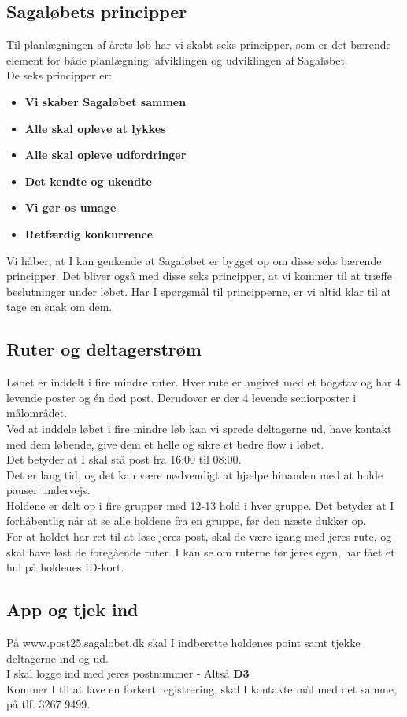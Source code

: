 \subsection{Sagaløbets principper}
Til planlægningen af årets løb har vi skabt seks principper, som er det bærende element for både planlægning, afviklingen og udviklingen af Sagaløbet.\\
De seks principper er:
\begin{itemize}
  \item \textbf{Vi skaber Sagaløbet sammen}
  \item \textbf{Alle skal opleve at lykkes}
  \item \textbf{Alle skal opleve udfordringer}
  \item \textbf{Det kendte og ukendte}
  \item \textbf{Vi gør os umage}
  \item \textbf{Retfærdig konkurrence}
\end{itemize}
Vi håber, at I kan genkende at Sagaløbet er bygget op om disse seks bærende principper. Det bliver også med disse seks principper, at vi kommer til at træffe beslutninger under løbet. Har I spørgsmål til principperne, er vi altid klar til at tage en snak om dem.
\subsection{Ruter og deltagerstrøm}
Løbet er inddelt i fire mindre ruter. Hver rute er angivet med et bogstav og har 4 levende poster og én død post. Derudover er der 4 levende seniorposter i målområdet.\\
Ved at inddele løbet i fire mindre løb kan vi sprede deltagerne ud, have kontakt med dem løbende, give dem et helle og sikre et bedre flow i løbet.\\
\newline
Det betyder at I skal stå post fra 16:00 til 08:00.\\
Det er lang tid, og det kan være nødvendigt at hjælpe hinanden med at holde pauser undervejs.\\
\newline
Holdene er delt op i fire grupper med 12-13 hold i hver gruppe. Det betyder at I forhåbentlig når at se alle holdene fra en gruppe, før den næste dukker op.\\
For at holdet har ret til at løse jeres post, skal de være igang med jeres rute, og skal have løst de foregående ruter. I kan se om ruterne før jeres egen, har fået et hul på holdenes ID-kort.
\subsection{App og tjek ind}
På www.post25.sagalobet.dk skal I indberette holdenes point samt tjekke deltagerne ind og ud.\\
I skal logge ind med jeres postnummer - Altså \textbf{D3}\\
\newline
Kommer I til at lave en forkert registrering, skal I kontakte mål med det samme, på tlf. 3267 9499.
\newpage
\vspace*{.4cm}
